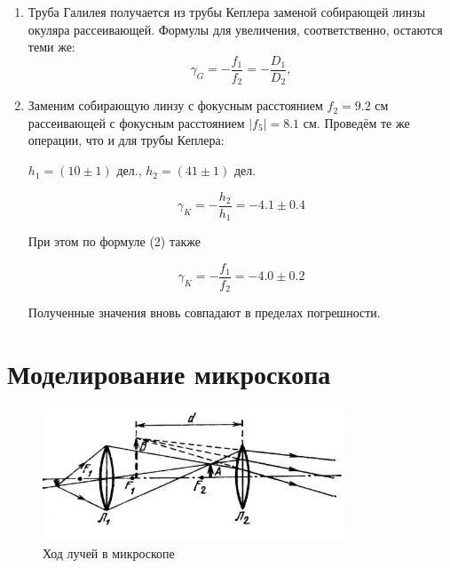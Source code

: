 \documentclass[a4paper,12pt]{article} %
\begin{document}
\begin{enumerate}
    \item Труба Галилея получается из трубы Кеплера заменой собирающей линзы окуляра рассеивающей. Формулы для увеличения, соответственно, остаются теми же:
\begin{equation}
    \gamma_G = -\frac{f_1}{f_2} = -\frac{D_1}{D_2},
\end{equation}

\item Заменим собирающую линзу с фокусным расстоянием $ f_2 = 9.2 $ см рассеивающей с фокусным расстоянием $ |f_5| = 8.1 $ см. Проведём те же операции, что и для трубы Кеплера:

\begin{center}
$h_1 = (10 \pm 1) $ дел., \hspace{1cm} $h_2 = (41 \pm 1) $ дел. \par
\[ \boxed{\gamma_K = -\frac{h_2}{h_1} = -4.1 \pm 0.4} \]
\end{center}

При этом по формуле (2) также
\begin{center}
    \[ \boxed{\gamma_K = -\frac{f_1}{f_2} = -4.0 \pm 0.2} \]
\end{center}

Полученные значения вновь совпадают в пределах погрешности.
\end{enumerate}

\section*{Моделирование микроскопа}

    \begin{figure}[h]
    \centering
    \includegraphics[width=9cm]{micro.PNG}
    \caption{Ход лучей в микроскопе}
    \label{fig:vac}
\end{figure}
\end{document}
